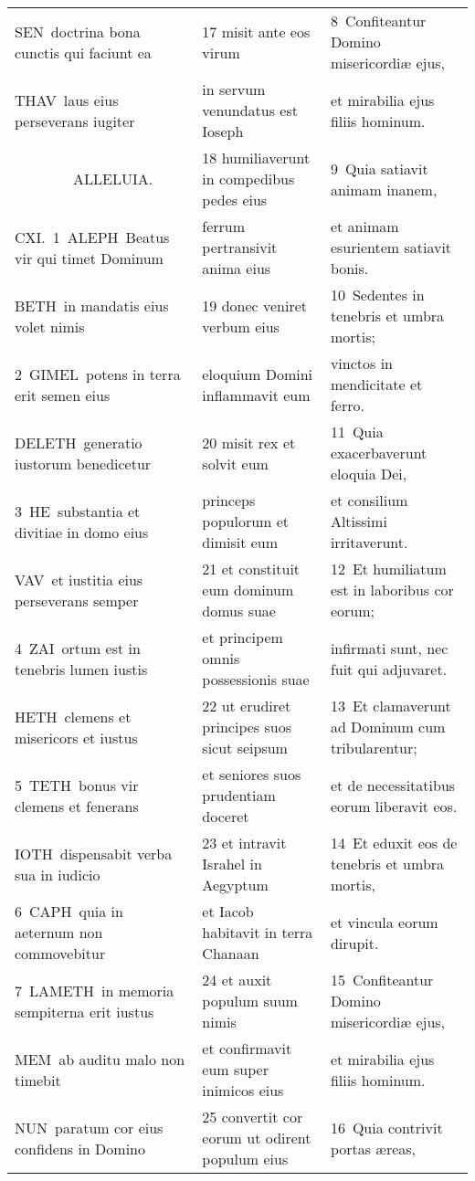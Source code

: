\documentclass{article}
\begin{document}
\begin{longtable}{@{}p{}p{}p{}@{}}
SEN doctrina bona cunctis qui faciunt ea	&	17 misit ante eos virum	&	8 Confiteantur Domino misericordiæ ejus,	\\
THAV laus eius perseverans iugiter	&	in servum venundatus est Ioseph	&	et mirabilia ejus filiis hominum.	\\
    ALLELUIA.	&	18 humiliaverunt in compedibus pedes eius	&	9 Quia satiavit animam inanem,	\\
CXI. 1 ALEPH Beatus vir qui timet Dominum	&	ferrum pertransivit anima eius	&	et animam esurientem satiavit bonis.	\\
BETH in mandatis eius volet nimis	&	19 donec veniret verbum eius	&	10 Sedentes in tenebris et umbra mortis;	\\
2 GIMEL potens in terra erit semen eius	&	eloquium Domini inflammavit eum	&	vinctos in mendicitate et ferro.	\\
DELETH generatio iustorum benedicetur	&	20 misit rex et solvit eum	&	11 Quia exacerbaverunt eloquia Dei,	\\
3 HE substantia et divitiae in domo eius	&	princeps populorum et dimisit eum	&	et consilium Altissimi irritaverunt.	\\
VAV et iustitia eius perseverans semper	&	21 et constituit eum dominum domus suae	&	12 Et humiliatum est in laboribus cor eorum;	\\
4 ZAI ortum est in tenebris lumen iustis	&	et principem omnis possessionis suae	&	infirmati sunt, nec fuit qui adjuvaret.	\\
HETH clemens et misericors et iustus	&	22 ut erudiret principes suos sicut seipsum	&	13 Et clamaverunt ad Dominum cum tribularentur;	\\
5 TETH bonus vir clemens et fenerans	&	et seniores suos prudentiam doceret	&	et de necessitatibus eorum liberavit eos.	\\
IOTH dispensabit verba sua in iudicio	&	23 et intravit Israhel in Aegyptum	&	14 Et eduxit eos de tenebris et umbra mortis,	\\
6 CAPH quia in aeternum non commovebitur	&	et Iacob habitavit in terra Chanaan	&	et vincula eorum dirupit.	\\
7 LAMETH in memoria sempiterna erit iustus	&	24 et auxit populum suum nimis	&	15 Confiteantur Domino misericordiæ ejus,	\\
MEM ab auditu malo non timebit	&	et confirmavit eum super inimicos eius	&	et mirabilia ejus filiis hominum.	\\
NUN paratum cor eius confidens in Domino	&	25 convertit cor eorum ut odirent populum eius	&	16 Quia contrivit portas æreas,	\\

\end{longtable}
\end{document}

